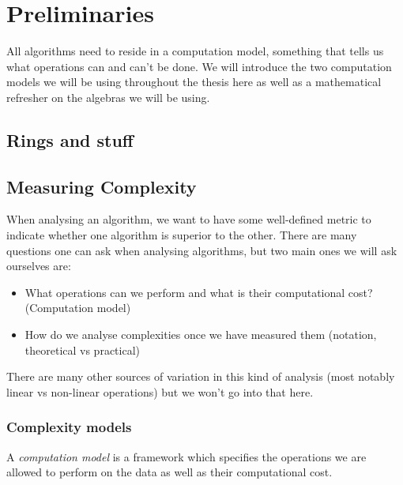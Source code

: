 \chapter{Preliminaries}\label{preliminaries}

All algorithms need to reside in a computation model, something that tells us what operations can and can't be done. We will introduce the two computation models we will be using throughout the thesis here as well as a mathematical refresher on the algebras we will be using.

\section{Rings and stuff}
\label{sec:prelim-rings}

\section{Measuring Complexity}%
\label{sec:Measuring Complexity}


When analysing an algorithm, we want to have some well-defined metric to indicate whether one algorithm is superior to the other. There are many questions one can ask when analysing algorithms, but two main ones we will ask ourselves are:

\begin{itemize}
    \item What operations can we perform and what is their computational cost?(Computation model)
    \item How do we analyse complexities once we have measured them (notation, theoretical vs practical)
\end{itemize}

There are many other sources of variation in this kind of analysis (most notably linear vs non-linear operations) but we won't go into that here.

\subsection{Complexity models}%
\label{sub:Complexity models}

A \textit{computation model} is a framework which specifies the operations we are allowed to perform on the data as well as their computational cost. 

